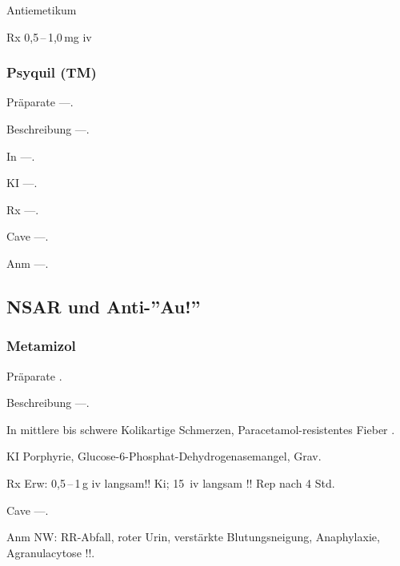  Antiemetikum
\begin{labeling}[:]{mm}
\item[Rx] 0,5\,--\,1,0\,mg iv




\end{labeling}

\subsubsection{Psyquil (TM)}

\begin{labeling}[:]{mm}
  \item[Präparate] ---.
  \item[Beschreibung] ---.
  \item[In] ---.
  \item[KI] ---.
  \item[Rx] ---.
  \item[Cave] ---.
  \item[Anm] ---.
\end{labeling} 



\subsection{NSAR und Anti-''Au!''}

\subsubsection{Metamizol}
\begin{labeling}[:]{mm}
  \item[Präparate]  .
  \item[Beschreibung] ---.
  \item[In]  mittlere bis schwere Kolikartige Schmerzen, Paracetamol-resistentes
Fieber .
  \item[KI] Porphyrie, Glucose-6-Phosphat-Dehydrogenasemangel, Grav.
  \item[Rx] Erw: 0,5\,--\,1\,g iv langsam!!\newline
Ki; 15\, iv langsam !!\newline
Rep nach 4 Std.
  \item[Cave] ---.
  \item[Anm] NW: RR-Abfall, roter Urin, verstärkte Blutungsneigung, Anaphylaxie,
Agranulacytose !!.
\end{labeling}



